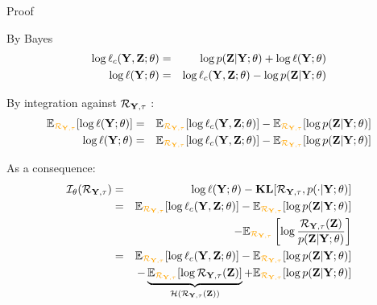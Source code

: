 \documentclass[compress,10pt]{beamer}
\begin{document}
 \begin{frame}[allowframebreaks]{Proof}

By Bayes
\begin{eqnarray*}
\log \ell_c(\mathbf{Y},\mathbf{Z}; \theta)&=& \log  p(\mathbf{Z} | \mathbf{Y}; \theta) +   \log \ell(\mathbf{Y} ; \theta)   \\
 \log \ell(\mathbf{Y} ; \theta) &=& \log \ell_c(\mathbf{Y},\mathbf{Z}; \theta) -  \log  p(\mathbf{Z} | \mathbf{Y}; \theta)
\end{eqnarray*}

By integration against $\mathcal{R}_{\mathbf{Y},\mathbf{\tau}}$ : 
\begin{eqnarray*}
 \mathbb{E}_{\color{dgreen}\mathcal{R}_{\Xall,\btau}} [ \log  \ell(\Xall ; \theta)] &=&  \mathbb{E}_{\color{dgreen}\mathcal{R}_{\Xall,\btau}} [\log \ell_c(\bX,\bZ; \theta)] -  \mathbb{E}_{\color{dgreen}\mathcal{R}_{\Xall,\btau}} [ \log  p(\bZ | \Xall; \theta)] \\
 \log \ell(\Xall ; \theta) &=&  \mathbb{E}_{\color{dgreen}\mathcal{R}_{\Xall,\btau}} [\log \ell_c(\bX,\bZ; \theta)] -  \mathbb{E}_{\color{dgreen}\mathcal{R}_{\Xall,\btau}} [ \log  p(\bZ | \Xall; \theta)]
\end{eqnarray*}

As a consequence: 
\begin{eqnarray*}
\mathcal{I}_{\theta}(\mathcal{R}_{\Xall,\btau}) &=& \log \ell(\Xall ; \theta) -   \mathbf{KL}[\mathcal{R}_{\Xall,\btau}, p(\cdot | \Xall; \theta)] \\
 &=& \mathbb{E}_{\color{dgreen}\mathcal{R}_{\Xall,\btau}} [\log \ell_c(\bX,\bZ; \theta)] -  \mathbb{E}_{\color{dgreen}\mathcal{R}_{\Xall,\btau}} [ \log  p(\bZ | \Xall; \theta)]  \\
&& -   \mathbb{E}_{\color{dgreen}\mathcal{R}_{\Xall,\btau}} \left[\log \frac{\mathcal{R}_{\Xall,\btau}(\bZ)} { p(\bZ | \Xall; \theta)}\right]\\
&=&  \mathbb{E}_{\color{dgreen}\mathcal{R}_{\Xall,\btau}} [\log \ell_c(\bX,\bZ; \theta)] -  \mathbb{E}_{\color{dgreen}\mathcal{R}_{\Xall,\btau}} [ \log  p(\bZ | \Xall; \theta)] \\
&& -   \underbrace{\mathbb{E}_{\color{dgreen}\mathcal{R}_{\Xall,\btau}} [\log \mathcal{R}_{\Xall,\btau}(\bZ)]}_{  \mathcal{H}\left(\mathcal{R}_{\Xall,\btau}(\bZ)\right) } +  \mathbb{E}_{\color{dgreen}\mathcal{R}_{\Xall,\btau}} [\log p(\bZ | \Xall; \theta)]
\end{eqnarray*}




  \end{frame}
\end{document}
